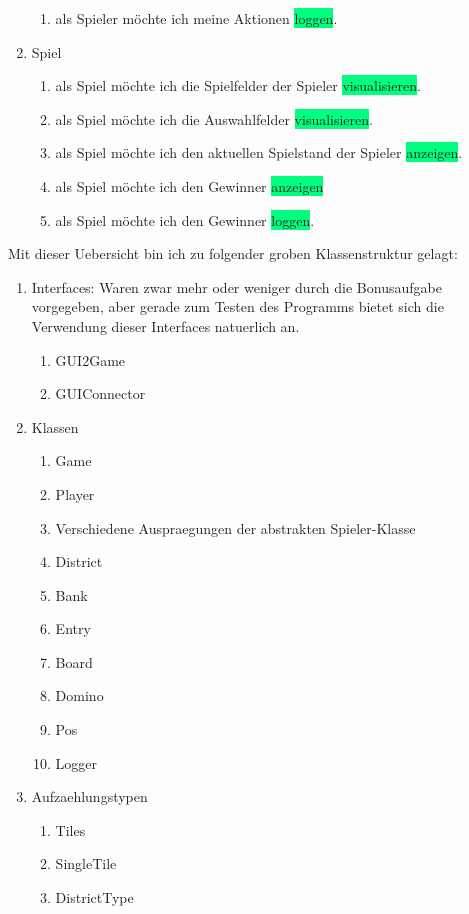 \begin{enumerate}
\begin{enumerate}
		\item als \colorbox{Apricot}{Spieler} möchte ich meine Aktionen \colorbox{SpringGreen}{loggen}.
	\end{enumerate}
	\item Spiel
	\begin{enumerate}
		\item als \colorbox{Apricot}{Spiel} möchte ich die \colorbox{Apricot}{Spielfelder} der Spieler \colorbox{SpringGreen}{visualisieren}.
		\item als \colorbox{Apricot}{Spiel} möchte ich die \colorbox{Apricot}{Auswahlfelder} \colorbox{SpringGreen}{visualisieren}.
		\item als \colorbox{Apricot}{Spiel} möchte ich den aktuellen Spielstand der Spieler \colorbox{SpringGreen}{anzeigen}.
		\item als \colorbox{Apricot}{Spiel} möchte ich den \colorbox{Apricot}{Gewinner} \colorbox{SpringGreen}{anzeigen}
		\item als \colorbox{Apricot}{Spiel} möchte ich den \colorbox{Apricot}{Gewinner} \colorbox{SpringGreen}{loggen}.
	\end{enumerate}
\end{enumerate}

Mit dieser Uebersicht bin ich zu folgender groben Klassenstruktur gelagt: 
\begin{enumerate}
	\item Interfaces: Waren zwar mehr oder weniger durch die Bonusaufgabe vorgegeben, aber gerade zum Testen des Programms bietet sich die Verwendung dieser Interfaces natuerlich an. 
	\begin{enumerate}
		\item GUI2Game
		\item GUIConnector
	\end{enumerate}
	\item Klassen
	\begin{enumerate}
		\item Game
		\item Player
		\item Verschiedene Auspraegungen der abstrakten Spieler-Klasse
		\item District
		\item Bank
		\item Entry
		\item Board
		\item Domino
		\item Pos
		\item Logger
	\end{enumerate}
	\item Aufzaehlungstypen
	\begin{enumerate}
		\item Tiles
		\item SingleTile
		\item DistrictType
	\end{enumerate}
\end{enumerate}
